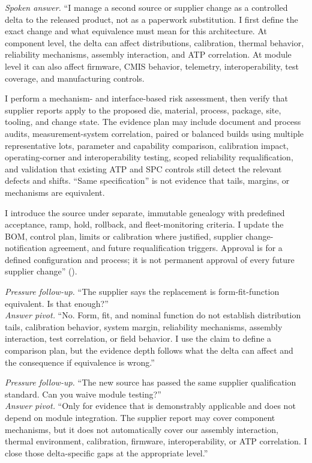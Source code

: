 \textit{Spoken answer.}
``I manage a second source or supplier change as a controlled delta to the
released product, not as a paperwork substitution. I first define the exact
change and what equivalence must mean for this architecture. At component
level, the delta can affect distributions, calibration, thermal behavior,
reliability mechanisms, assembly interaction, and ATP correlation. At module
level it can also affect firmware, CMIS behavior, telemetry, interoperability,
test coverage, and manufacturing controls.

I perform a mechanism- and interface-based risk assessment, then verify that
supplier reports apply to the proposed die, material, process, package, site,
tooling, and change state. The evidence plan may include document and process
audits, measurement-system correlation, paired or balanced builds using
multiple representative lots, parameter and capability comparison,
calibration impact, operating-corner and interoperability testing, scoped
reliability requalification, and validation that existing ATP and SPC controls
still detect the relevant defects and shifts. ``Same specification'' is not
evidence that tails, margins, or mechanisms are equivalent.

I introduce the source under separate, immutable genealogy with predefined
acceptance, ramp, hold, rollback, and fleet-monitoring criteria. I update the
BOM, control plan, limits or calibration where justified, supplier change-
notification agreement, and future requalification triggers. Approval is for a
defined configuration and process; it is not permanent approval of every future
supplier change''
().

\textit{Pressure follow-up.} ``The supplier says the replacement is
form-fit-function equivalent. Is that enough?''\\
\textit{Answer pivot.} ``No. Form, fit, and nominal function do not establish
distribution tails, calibration behavior, system margin, reliability
mechanisms, assembly interaction, test correlation, or field behavior. I use
the claim to define a comparison plan, but the evidence depth follows what the
delta can affect and the consequence if equivalence is wrong.''

\textit{Pressure follow-up.} ``The new source has passed the same supplier
qualification standard. Can you waive module testing?''\\
\textit{Answer pivot.} ``Only for evidence that is demonstrably applicable and
does not depend on module integration. The supplier report may cover component
mechanisms, but it does not automatically cover our assembly interaction,
thermal environment, calibration, firmware, interoperability, or ATP
correlation. I close those delta-specific gaps at the appropriate level.''

